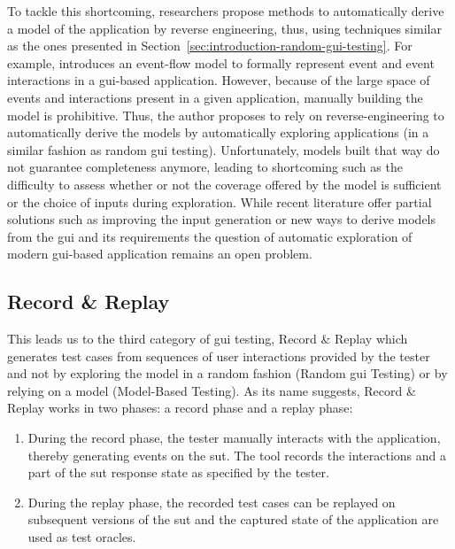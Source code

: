 To tackle this shortcoming, researchers propose methods to automatically derive a model of the application by reverse engineering, thus, using techniques similar as the ones presented in Section~\ref{sec:introduction-random-gui-testing}. For example, \textcite{Memon2007} introduces an event-flow model to formally represent event and event interactions in a \gls{gui}-based application. However, because of the large space of events and interactions present in a given application, manually building the model is prohibitive. Thus, the author proposes to rely on reverse-engineering to automatically derive the models by automatically exploring applications (in a similar fashion as random \gls{gui} testing). Unfortunately, models built that way do not guarantee completeness anymore, leading to shortcoming such as the difficulty to assess whether or not the coverage offered by the model is sufficient or the choice of inputs during exploration. While recent literature offer partial solutions such as improving the input generation \cite{Biagiola2019} or new ways to derive models from the \gls{gui} and its requirements \cite{Canny2020} the question of automatic exploration of modern \gls{gui}-based application remains an open problem.

\subsection{Record \& Replay}
\label{sec:introduction-record-and-replay}

This leads us to the third category of \gls{gui} testing, Record \& Replay which generates test cases from sequences of user interactions provided by the tester and not by exploring the model in a random fashion (Random \gls{gui} Testing) or by relying on a model (Model-Based Testing). As its name suggests, Record \& Replay works in two phases: a record phase and a replay phase:

\begin{enumerate}
    \item During the record phase, the tester manually interacts with the application, thereby generating events on the \gls{sut}. The tool records the interactions and a part of the \gls{sut} response state as specified by the tester.
    \item During the replay phase, the recorded test cases can be replayed on subsequent versions of the \gls{sut} and the captured state of the application are used as test oracles.
\end{enumerate}

